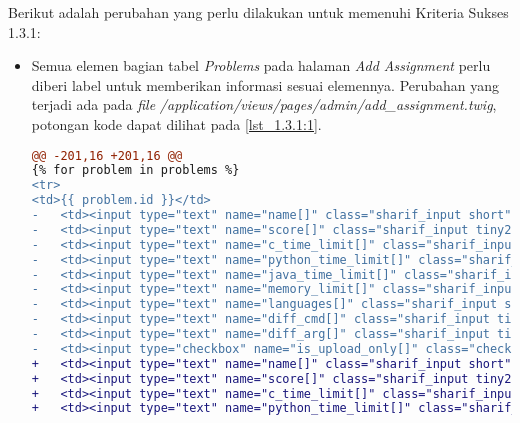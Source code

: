 Berikut adalah perubahan yang perlu dilakukan untuk memenuhi Kriteria Sukses 1.3.1:

\begin{itemize}
	\item Semua elemen bagian tabel \textit{Problems} pada halaman \textit{Add Assignment} perlu diberi label untuk memberikan informasi sesuai elemennya. Perubahan yang terjadi ada pada \textit{file} \textit{/application/views/pages/admin/add\_assignment.twig}, potongan kode dapat dilihat pada \ref{lst_1.3.1:1}.
	
\begin{lstlisting}[language=diff, caption=Perubahan pada \textit{file} \textit{add\_assignment.twig}, label=lst_1.3.1:1, basicstyle=\ttfamily, frame=single,
columns=fullflexible, keepspaces=true, breaklines=true]
@@ -201,16 +201,16 @@
{% for problem in problems %}
<tr>
<td>{{ problem.id }}</td>
- 	<td><input type="text" name="name[]" class="sharif_input short" value="{{ problem.name }}"/></td>
- 	<td><input type="text" name="score[]" class="sharif_input tiny2" value="{{ problem.score }}"/></td>
- 	<td><input type="text" name="c_time_limit[]" class="sharif_input tiny2" value="{{ problem.c_time_limit }}"/></td>
- 	<td><input type="text" name="python_time_limit[]" class="sharif_input tiny2" value="{{ problem.python_time_limit }}"/></td>
- 	<td><input type="text" name="java_time_limit[]" class="sharif_input tiny2" value="{{ problem.java_time_limit }}"/></td>
- 	<td><input type="text" name="memory_limit[]" class="sharif_input tiny" value="{{ problem.memory_limit }}"/></td>
- 	<td><input type="text" name="languages[]" class="sharif_input short2" value="{{ problem.allowed_languages }}"/></td>
- 	<td><input type="text" name="diff_cmd[]" class="sharif_input tiny" value="{{ problem.diff_cmd }}"/></td>
- 	<td><input type="text" name="diff_arg[]" class="sharif_input tiny" value="{{ problem.diff_arg }}"/></td>
- 	<td><input type="checkbox" name="is_upload_only[]" class="check" value="{{ problem.id }}" {{ problem.is_upload_only ? 'checked' }}/></td>
+ 	<td><input type="text" name="name[]" class="sharif_input short" value="{{ problem.name }}" aria-label="Problem Name"/></td>
+ 	<td><input type="text" name="score[]" class="sharif_input tiny2" value="{{ problem.score }}" aria-label="Score"/></td>
+ 	<td><input type="text" name="c_time_limit[]" class="sharif_input tiny2" value="{{ problem.c_time_limit }}" aria-label="Time Limit for C"/></td>
+ 	<td><input type="text" name="python_time_limit[]" class="sharif_input tiny2" value="{{ problem.python_time_limit }}" aria-label="Time Limit for Python"/></td>

\end{lstlisting}
\end{itemize}
